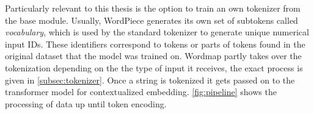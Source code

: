 Particularly relevant to this thesis is the option to train an own tokenizer from the base module.
Usually, WordPiece generates its own set of subtokens called \textit{vocabulary}, which is used by the standard tokenizer to generate unique numerical input IDs.
These identifiers correspond to tokens or parts of tokens found in the original dataset that the model was trained on.
Wordmap partly takes over the tokenization depending on the the type of input it receives, the exact process is given in \autoref{subsec:tokenizer}.
Once a string is tokenized it gets passed on to the transformer model for contextualized embedding.
\autoref{fig:pipeline} shows the processing of data up until token encoding.

\begin{figure}
    \centering



\end{figure}
